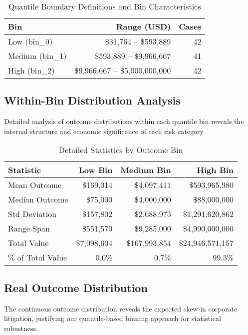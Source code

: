 \documentclass[11pt]{article}
\begin{document}
\begin{table}[H]
\centering
\caption{Quantile Boundary Definitions and Bin Characteristics}
\begin{tabular}{lrr}
\toprule
\textbf{Bin} & \textbf{Range (USD)} & \textbf{Cases} \\
\midrule
Low (bin\_0) & \$31,764 -- \$593,889 & 42 \\
Medium (bin\_1) & \$593,889 -- \$9,966,667 & 41 \\
High (bin\_2) & \$9,966,667 -- \$5,000,000,000 & 42 \\
\bottomrule
\end{tabular}
\end{table}

\subsection{Within-Bin Distribution Analysis}

Detailed analysis of outcome distributions within each quantile bin reveals the internal structure and economic significance of each risk category.

\begin{table}[H]
\centering
\caption{Detailed Statistics by Outcome Bin}
\begin{tabular}{lrrr}
\toprule
\textbf{Statistic} & \textbf{Low Bin} & \textbf{Medium Bin} & \textbf{High Bin} \\
\midrule
Mean Outcome & \$169,014 & \$4,097,411 & \$593,965,980 \\
Median Outcome & \$75,000 & \$4,000,000 & \$88,000,000 \\
Std Deviation & \$157,802 & \$2,688,973 & \$1,291,620,862 \\
Range Span & \$551,570 & \$9,285,000 & \$4,990,000,000 \\
Total Value & \$7,098,604 & \$167,993,854 & \$24,946,571,157 \\
\% of Total Value & 0.0\% & 0.7\% & 99.3\% \\
\bottomrule
\end{tabular}
\end{table}

\subsection{Real Outcome Distribution}

The continuous outcome distribution reveals the expected skew in corporate litigation, justifying our quantile-based binning approach for statistical robustness.
\end{document}
